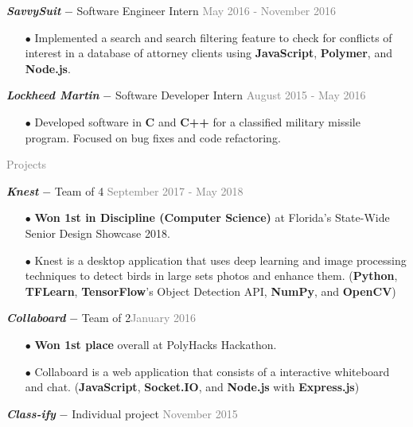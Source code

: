 \documentclass[11pt]{article}
\newcommand{\rsection}[1]{\vspace{1.5em}\textcolor{gray}{\Large \robotoslab #1}\vspace{0.5em}}
\newcommand{\bt}[1]{\textit{\textbf{#1}}} %
\newcommand{\gap}[0]{\vspace{0.3em}} %
\newcommand{\dash}[0]{ $-$ } %
\newcommand{\gray}[1]{\textcolor{gray}{#1}}
\begin{document}
\gap

\bt{SavvySuit}\dash Software Engineer Intern \hfill \gray{May 2016 - November 2016}

\begin{itemize}
\item[$\bullet$] Implemented a search and search filtering feature to check for conflicts of interest in a database of attorney clients using \textbf{JavaScript}, \textbf{Polymer}, and \textbf{Node.js}.
\end{itemize}

\gap

\bt{Lockheed Martin} \dash Software Developer Intern \hfill \gray{August 2015 - May 2016}

\begin{itemize}
\item[$\bullet$] Developed software in \textbf{C} and \textbf{C++} for a classified military missile program. Focused on bug fixes and code refactoring.
\end{itemize}

\rsection{Projects}

\bt{Knest}\dash Team of 4 \hfill \gray{September 2017 - May 2018}

\begin{itemize}
\item[$\bullet$] \textbf{Won 1st in Discipline (Computer Science)} at Florida's State-Wide Senior Design Showcase 2018.
\item[$\bullet$] Knest is a desktop application that uses deep learning and image processing techniques to detect birds in large sets photos and enhance them. (\textbf{Python}, \textbf{TFLearn}, \textbf{TensorFlow}'s Object Detection API, \textbf{NumPy}, and \textbf{OpenCV}) 
\end{itemize}

\gap

\bt{Collaboard}\dash Team of 2\hfill \gray{January 2016}

\begin{itemize}
\item[$\bullet$] \textbf{Won 1st place} overall at PolyHacks Hackathon.
\item[$\bullet$] Collaboard is a web application that consists of a interactive whiteboard and chat. (\textbf{JavaScript}, \textbf{Socket.IO}, and \textbf{Node.js} with \textbf{Express.js})
\end{itemize}

\gap

\bt{Class-ify}\dash Individual project \hfill \gray{November 2015}
\end{document}

